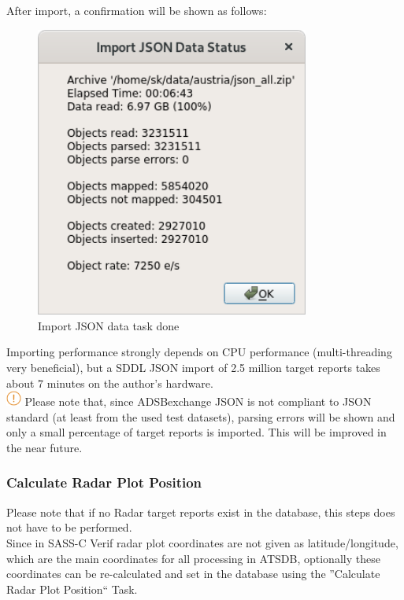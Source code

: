 {After import, a confirmation will be shown as follows:

\begin{figure}[H]
  \center
    \includegraphics[width=9cm,frame]{../screenshots/json_import_done.png}
  \caption{Import JSON data task done}
\end{figure}

Importing performance strongly depends on CPU performance (multi-threading very beneficial), but a SDDL JSON import of 2.5 million target reports takes about 7 minutes on the author's hardware. \\

\includegraphics[width=0.5cm]{../../data/icons/hint.png} Please note that, since ADSBexchange JSON is not compliant to JSON standard (at least from the used test datasets), parsing errors will be shown and only a small percentage of target reports is imported. This will be improved in the near future.\\

\subsubsection{Calculate Radar Plot Position}

Please note that if no Radar target reports exist in the database, this steps does not have to be performed.\\

Since in SASS-C Verif radar plot coordinates are not given as latitude/longitude, which are the main coordinates for all processing in ATSDB, optionally these coordinates can be re-calculated and set in the database using the ''Calculate Radar Plot Position`` Task. \\

}
